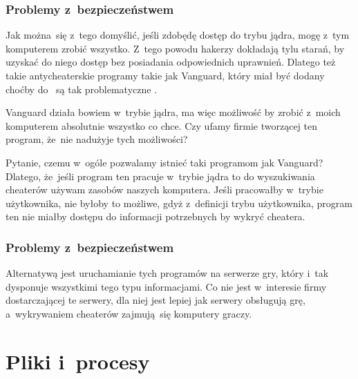 \documentclass[10pt,t]{beamer}
\begin{document}
\begin{frame}
  \frametitle{Problemy z~bezpieczeństwem}


  Jak można~się z~tego domyślić, jeśli zdobędę dostęp do trybu jądra, mogę
  z~tym komputerem zrobić wszystko. Z~tego powodu hakerzy dokładają tylu
  starań, by uzyskać do niego dostęp \alert{bez} posiadania odpowiednich
  uprawnień. Dlatego też takie antycheaterskie programy takie jak Vanguard,
  który miał być dodany choćby do
  ~są tak problematyczne
  \parencite{Low-Level-Why-Riots-anti-cheat-is-a-HUGE-problem-Ver-2024}.

  Vanguard działa bowiem w~trybie jądra, ma więc możliwość by zrobić
  z~moich komputerem absolutnie wszystko co chce. Czy ufamy firmie
  tworzącej ten program, że~nie nadużyje tych możliwości?

  Pytanie, czemu w~ogóle pozwalamy istnieć taki programom jak Vanguard?
  Dlatego, że~jeśli program ten pracuje w~trybie jądra to do wyszukiwania
  cheaterów używam zasobów \alert{naszych} komputera. Jeśli pracowałby
  w~trybie użytkownika, nie byłoby to możliwe, gdyż z~definicji trybu
  użytkownika, program ten nie miałby dostępu do informacji potrzebnych by
  wykryć cheatera.

\end{frame}





\begin{frame}
  \frametitle{Problemy z~bezpieczeństwem}


  Alternatywą jest uruchamianie tych programów na serwerze
  gry, który i~tak dysponuje wszystkimi tego typu informacjami. Co nie jest
  w~interesie firmy dostarczającej te serwery, dla niej jest lepiej jak
  serwery obsługują grę, a~wykrywaniem cheaterów zajmują~się komputery
  graczy.

\end{frame}



















\section{Pliki i~procesy}
\end{document}
